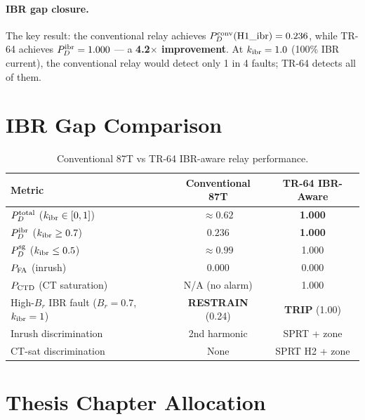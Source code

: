 \documentclass[11pt, a4paper]{article}
\newcommand{\kibr}{k_{\rm ibr}}
\begin{document}
\paragraph{IBR gap closure.}
The key result: the conventional relay achieves $P_D^{\rm conv}(\text{H1\_ibr})
= 0.236$, while TR-64 achieves $P_D^{\rm ibr} = 1.000$ — a \textbf{4.2$\times$
improvement}.  At $\kibr = 1.0$ (100\% IBR current), the conventional relay
would detect only 1 in 4 faults; TR-64 detects all of them.


\section{IBR Gap Comparison}
\label{sec:comparison}

\begin{table}[h]
\centering
\caption{Conventional 87T vs TR-64 IBR-aware relay performance.}
\label{tab:compare64}
\begin{tabular}{lcc}
\toprule
Metric & Conventional 87T & TR-64 IBR-Aware \\
\midrule
$P_D^{\rm total}$ ($\kibr \in [0,1]$)    & $\approx 0.62$ & \textbf{1.000} \\
$P_D^{\rm ibr}$ ($\kibr \geq 0.7$)       & $0.236$        & \textbf{1.000} \\
$P_D^{\rm sg}$ ($\kibr \leq 0.5$)        & $\approx 0.99$ & 1.000 \\
$P_{\rm FA}$ (inrush)                     & $0.000$        & 0.000 \\
$P_{\rm CTD}$ (CT saturation)             & N/A (no alarm) & 1.000 \\
High-$B_r$ IBR fault ($B_r=0.7$, $\kibr=1$) & \textbf{RESTRAIN} (0.24) & \textbf{TRIP} (1.00) \\
Inrush discrimination                    & 2nd harmonic   & SPRT + zone \\
CT-sat discrimination                    & None           & SPRT H2 + zone \\
\bottomrule
\end{tabular}
\end{table}


\section{Thesis Chapter Allocation}
\label{sec:thesis}
\end{document}
